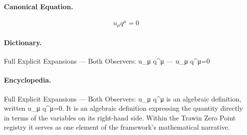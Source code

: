 \paragraph{Canonical Equation.}
\[
u_\mu q^\mu=0
\]

\paragraph{Dictionary.}
Full Explicit Expansions — Both Observers: u\_μ q\textasciicircum{}μ — u\_μ q\textasciicircum{}μ=0

\paragraph{Encyclopedia.}
Full Explicit Expansions — Both Observers: u\_μ q\textasciicircum{}μ is an algebraic definition, written u\_μ q\textasciicircum{}μ=0. It is an algebraic definition expressing the quantity directly in terms of the variables on its right-hand side. Within the Trawin Zero Point registry it serves as one element of the framework's mathematical narrative.
